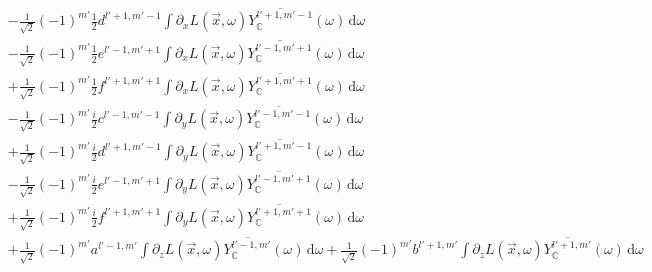 \documentclass{egpubl}
\newcommand{\ud}{\,\mathrm{d}} %
\begin{document}
\begin{align*}
\\&
-\frac{1}{\sqrt{2}}\left({-1}\right)^{m'}\frac{1}{2}d^{{l'+1,m'-1}}\int{\partial_xL\left (\vec{x} ,\omega \right )\overline{Y_{\mathbb{C}}^{l'+1, m'-1}}(\omega )\ud\omega}
\\&
-\frac{1}{\sqrt{2}}\left({-1}\right)^{m'}\frac{1}{2}e^{{l'-1,m'+1}}\int{\partial_xL\left (\vec{x} ,\omega \right )\overline{Y_{\mathbb{C}}^{l'-1, m'+1}}(\omega )\ud\omega}
\\&
+\frac{1}{\sqrt{2}}\left({-1}\right)^{m'}\frac{1}{2}f^{{l'+1,m'+1}}\int{\partial_xL\left (\vec{x} ,\omega \right )\overline{Y_{\mathbb{C}}^{l'+1, m'+1}}(\omega )\ud\omega}
\\&
-\frac{1}{\sqrt{2}}\left({-1}\right)^{m'}\frac{i}{2}c^{{l'-1,m'-1}}\int{\partial_yL\left (\vec{x} ,\omega \right )\overline{Y_{\mathbb{C}}^{l'-1, m'-1}}(\omega )\ud\omega}
\\&
+\frac{1}{\sqrt{2}}\left({-1}\right)^{m'}\frac{i}{2}d^{{l'+1,m'-1}}\int{\partial_yL\left (\vec{x} ,\omega \right )\overline{Y_{\mathbb{C}}^{l'+1, m'-1}}(\omega )\ud\omega}
\\&
-\frac{1}{\sqrt{2}}\left({-1}\right)^{m'}\frac{i}{2}e^{{l'-1,m'+1}}\int{\partial_yL\left (\vec{x} ,\omega \right )\overline{Y_{\mathbb{C}}^{l'-1, m'+1}}(\omega )\ud\omega}
\\&
+\frac{1}{\sqrt{2}}\left({-1}\right)^{m'}\frac{i}{2}f^{{l'+1,m'+1}}\int{\partial_yL\left (\vec{x} ,\omega \right )\overline{Y_{\mathbb{C}}^{l'+1, m'+1}}(\omega )\ud\omega}
\\&
+\frac{1}{\sqrt{2}}\left({-1}\right)^{m'}a^{{l'-1,m'}}\int{\partial_zL\left (\vec{x} ,\omega \right )\overline{Y_{\mathbb{C}}^{l'-1, m'}}(\omega )\ud\omega}
+\frac{1}{\sqrt{2}}\left({-1}\right)^{m'}b^{{l'+1,m'}}\int{\partial_zL\left (\vec{x} ,\omega \right )\overline{Y_{\mathbb{C}}^{l'+1, m'}}(\omega )\ud\omega}
\end{align*}
\end{document}
